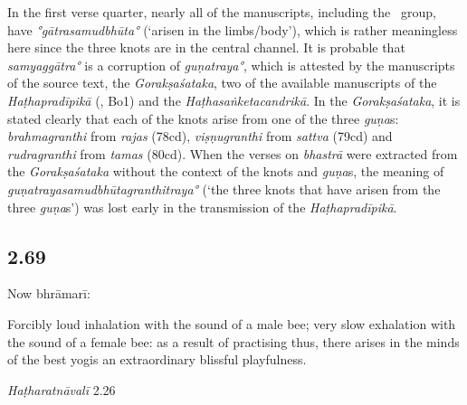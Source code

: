 \begin{ekdosis}
\begin{testimonia}[hp02_068]
\end{testimonia}

\begin{philcomm}[hp02_068]
In the first verse quarter, nearly all of the manuscripts, including the \textalpha\ group, have \emph{°gātrasamudbhūta°} (`arisen in the limbs/body'), which is rather meaningless here since the three knots are in the central channel. It is probable that \emph{samyaggātra°} is a corruption of \emph{guṇatraya°}, which is attested by the manuscripts of the source text, the \emph{Gorakṣaśataka}, two of the available manuscripts of the \emph{Haṭhapradīpikā} (, Bo1) and the \emph{Haṭhasaṅketacandrikā}. In the \emph{Gorakṣaśataka}, it is stated clearly that each of the knots arise from one of the three \emph{guṇa}s: \emph{brahmagranthi} from \emph{rajas} (78cd), \emph{viṣṇugranthi} from \emph{sattva} (79cd) and \emph{rudragranthi} from \emph{tamas} (80cd). When the verses on \emph{bhastrā} were extracted from the \emph{Gorakṣaśataka} without the context of the knots and \emph{guṇa}s, the meaning of \emph{guṇa\-traya\-sam\-udbhūta\-granthi\-traya°} (`the three knots that have arisen from the three \emph{guṇa}s') was lost early in the transmission of the \emph{Haṭhapradīpikā}.  
\end{philcomm}

\subsection*{2.69}
\begin{translation}[hp02_069]
Now bhrāmarī:

Forcibly loud inhalation with the sound of a male bee; very slow exhalation with the sound of a female bee: as a result of practising thus, there arises in the minds of the best yogis an extraordinary blissful playfulness.
\end{translation}

\begin{testimonia}[hp02_069]
\emph{Haṭharatnāvalī} 2.26

\begin{versinnote}
\tl{līlā ]°mūrcchā N,n1,n2,n3,n4,J,T,t1\\!}
\end{versinnote}



\end{testimonia}
\end{ekdosis}
